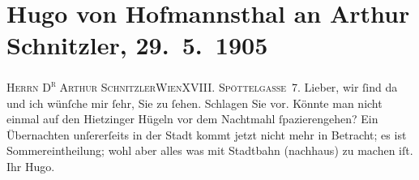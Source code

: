 

         \renewcommand{\erwaehnteOrte}{Orte: Edmund-Weiß-Gasse, Rodaun, Wien, XIII., Hietzing, XVIII., Währing}
         \renewcommand{\erwaehnteWerke}{}
               \section[Hugo von Hofmannsthal an Arthur Schnitzler, 29. 5. 1905]{ Hugo von Hofmannsthal an Arthur Schnitzler, 29. 5. 1905}\nopagebreak{}\rehead{ }\begin{ledgroupsized}[t]{13cm}\normalsize\beginnumbering \toendnotes[C]{\smallbreak\pagebreak[2]} 
\pstart{}{\pb}\textsc{Herrn D\textsuperscript{r} Arthur Schnitzler}\pend{}\pstart{}\textsc{Wien}\pend{}\pstart{}\textsc{XVIII. Spöttelgasse 7}.\pend{}{\bigskip}\pstart
           \noindent{}{\pb}Lieber, wir ſind
               da und ich wünſche mir ſehr, Sie zu ſehen. Schlagen Sie vor. Könnte man nicht einmal
               auf den Hietzinger Hügeln vor dem Nachtmahl
               ſpazierengehen? Ein Übernachten unſererſeits in der Stadt kommt jetzt nicht mehr in
               Betracht; es ist Sommereintheilung; wohl aber alles was mit Stadtbahn (nachhaus) zu
               machen iſt.\pend
           \pstart Ihr \spacefill\mbox{Hugo.}\pend{}
         
         \endnumbering{}\end{ledgroupsized}  \newcommand{\dateiname}{L01521}\newcommand{\titel}{Hugo von Hofmannsthal an Arthur Schnitzler, 29. 5. 1905}\newcommand{\editorInnen}{Martin Anton Müller und Gerd-Hermann Susen}
      